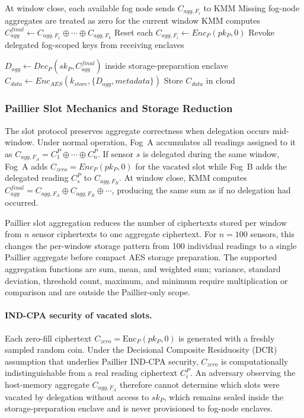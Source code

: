 \documentclass[conference]{IEEEtran}
\begin{document}
\begin{algorithm}
\begin{algorithmic}[1]
\STATE At window close, each available fog node sends $C_{agg,F_i}$ to KMM
\STATE Missing fog-node aggregates are treated as zero for the current window
\STATE KMM computes $C_{agg}^{final}\leftarrow C_{agg,F_1}\oplus\cdots\oplus C_{agg,F_k}$
\STATE Reset each $C_{agg,F_i}\leftarrow Enc_P(pk_P,0)$
\STATE Revoke delegated fog-scoped keys from receiving enclaves

\STATE $D_{agg}\leftarrow Dec_P(sk_P,C_{agg}^{final})$ inside storage-preparation enclave
\STATE $C_{data}\leftarrow Enc_{AES}(k_{store},\{D_{agg},metadata\})$
\STATE Store $C_{data}$ in cloud

\end{algorithmic}
\end{algorithm}
    

    \subsubsection{\textbf{Paillier Slot Mechanics and Storage Reduction}}

    The slot protocol preserves aggregate correctness when delegation occurs mid-window. Under normal operation, Fog~A accumulates all readings assigned to it as $C_{agg,F_A}=C_1^P\oplus\cdots\oplus C_n^P$. If sensor $s$ is delegated during the same window, Fog~A adds $C_{zero}=Enc_P(pk_P,0)$ for the vacated slot while Fog~B adds the delegated reading $C_s^P$ to $C_{agg,F_B}$. At window close, KMM computes $C_{agg}^{final}=C_{agg,F_A}\oplus C_{agg,F_B}\oplus\cdots$, producing the same sum as if no delegation had occurred.

    Paillier slot aggregation reduces the number of ciphertexts stored per window from $n$ sensor ciphertexts to one aggregate ciphertext. For $n=100$ sensors, this changes the per-window storage pattern from 100 individual readings to a single Paillier aggregate before compact AES storage preparation. The supported aggregation functions are sum, mean, and weighted sum; variance, standard deviation, threshold count, maximum, and minimum require multiplication or comparison and are outside the Paillier-only scope.

    \paragraph{IND-CPA security of vacated slots.}
    Each zero-fill ciphertext $C_{zero}=\text{Enc}_P(pk_P,0)$ is generated with a freshly sampled random coin. Under the Decisional Composite Residuosity (DCR) assumption that underlies Paillier IND-CPA security, $C_{zero}$ is computationally indistinguishable from a real reading ciphertext $C_i^P$. An adversary observing the host-memory aggregate $C_{agg,F_A}$ therefore cannot determine which slots were vacated by delegation without access to $sk_P$, which remains sealed inside the storage-preparation enclave and is never provisioned to fog-node enclaves.
\end{document}
